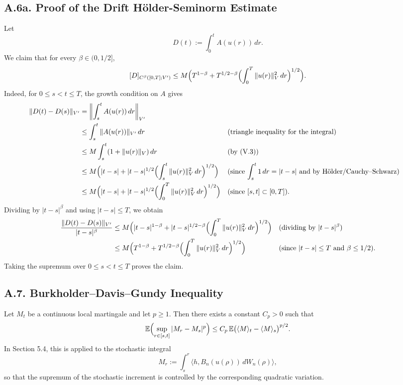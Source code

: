 \documentclass[11pt]{article}
\theoremstyle{definition}
\theoremstyle{remark}
\begin{document}
\subsection*{A.6a. Proof of the Drift H\"older-Seminorm Estimate}
Let
\[
  D(t):=\int_0^t A(u(r))\,dr.
\]
We claim that for every $\beta\in(0,1/2]$,
\[
  [D]_{C^\beta([0,T];V')}
  \le
  M\Bigl(
    T^{1-\beta}
    +
    T^{1/2-\beta}
    \Bigl(\int_0^T \|u(r)\|_V^2\,dr\Bigr)^{1/2}
  \Bigr).
\]
Indeed, for $0\le s<t\le T$, the growth condition on $A$ gives
\begin{align*}
  \|D(t)-D(s)\|_{V'}
  &=\left\|\int_s^t A(u(r))\,dr\right\|_{V'} \\
  &\le
  \int_s^t \|A(u(r))\|_{V'}\,dr
  &&\text{(triangle inequality for the integral)} \\
  &\le
  M\int_s^t (1+\|u(r)\|_V)\,dr
  &&\text{(by (V.3))} \\
  &\le
  M\Bigl(
    |t-s|
    +
    |t-s|^{1/2}
    \Bigl(\int_s^t \|u(r)\|_V^2\,dr\Bigr)^{1/2}
  \Bigr)
  &&\text{(since $\int_s^t 1\,dr=|t-s|$ and by H\"older/Cauchy--Schwarz)} \\
  &\le
  M\Bigl(
    |t-s|
    +
    |t-s|^{1/2}
    \Bigl(\int_0^T \|u(r)\|_V^2\,dr\Bigr)^{1/2}
  \Bigr)
  &&\text{(since $[s,t]\subset[0,T]$)}.
\end{align*}
Dividing by $|t-s|^\beta$ and using $|t-s|\le T$, we obtain
\begin{align*}
  \frac{\|D(t)-D(s)\|_{V'}}{|t-s|^\beta}
  &\le
  M\Bigl(
    |t-s|^{1-\beta}
    +
    |t-s|^{1/2-\beta}
    \Bigl(\int_0^T \|u(r)\|_V^2\,dr\Bigr)^{1/2}
  \Bigr)
  &&\text{(dividing by $|t-s|^\beta$)} \\
  &\le
  M\Bigl(
    T^{1-\beta}
    +
    T^{1/2-\beta}
    \Bigl(\int_0^T \|u(r)\|_V^2\,dr\Bigr)^{1/2}
  \Bigr)
  &&\text{(since $|t-s|\le T$ and $\beta\le 1/2$)}.
\end{align*}
Taking the supremum over $0\le s<t\le T$ proves the claim.

\subsection*{A.7. Burkholder--Davis--Gundy Inequality}
Let $M_t$ be a continuous local martingale and let $p\ge 1$. Then there exists a constant $C_p>0$ such that
\[
  \mathbb E\Bigl(\sup_{r\in[s,t]} |M_r-M_s|^p\Bigr)
  \le
  C_p\,\mathbb E\bigl(\langle M\rangle_t-\langle M\rangle_s\bigr)^{p/2}.
\]
In Section 5.4, this is applied to the stochastic integral
\[
  M_r:=\int_s^r \langle h,B_n(u(\rho))\,dW_n(\rho)\rangle,
\]
so that the supremum of the stochastic increment is controlled by the corresponding quadratic variation.
\end{document}
